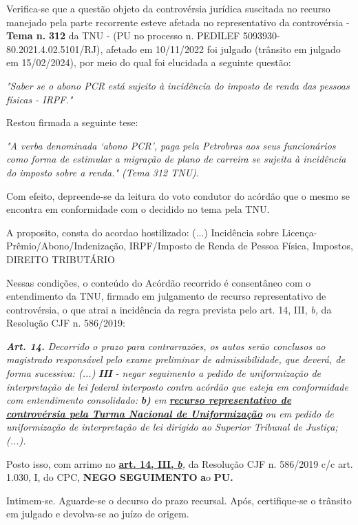 \documentclass[12pt]{article}
\begin{document}
\justifying
\noindent Verifica-se que a questão objeto da controvérsia jurídica suscitada no recurso manejado pela parte recorrente esteve afetada no representativo da controvérsia - \textbf{Tema n. }\textbf{312} da TNU - (PU no processo n. PEDILEF 5093930-80.2021.4.02.5101/RJ),  afetado em 10/11/2022 foi julgado (trânsito em julgado em 15/02/2024), por meio do qual foi elucidada a seguinte questão:

\noindent \textit{"Saber se o abono PCR está sujeito à incidência do imposto de renda das pessoas físicas - IRPF."}

\noindent Restou firmada a seguinte tese:

\noindent \textit{"A verba denominada ‘abono PCR’, paga pela Petrobras aos seus funcionários como forma de estimular a migração de plano de carreira se sujeita à incidência do imposto sobre a renda." (Tema 312 TNU).}

\noindent Com efeito, depreende-se da leitura do voto condutor do acórdão que o mesmo se encontra em conformidade com o decidido no  tema pela TNU.

\noindent A proposito, consta do acordao hostilizado: (...) Incidência sobre Licença-Prêmio/Abono/Indenização, IRPF/Imposto de Renda de Pessoa Física, Impostos, DIREITO TRIBUTÁRIO

\noindent Nessas condições, o conteúdo do Acórdão recorrido é consentâneo com o entendimento da TNU, firmado em julgamento de recurso representativo de controvérsia, o que atrai a incidência da regra prevista pelo art. 14, III, \textit{b,} da Resolução CJF n. 586/2019:

\noindent \textit{\textbf{Art. 14.}}\textit{ Decorrido o prazo para contrarrazões, os autos serão conclusos ao magistrado responsável pelo exame preliminar de admissibilidade, que deverá, de forma sucessiva: (...) }\textit{\textbf{III }}\textit{- negar seguimento a pedido de uniformização de interpretação de lei federal interposto contra acórdão que esteja em conformidade com entendimento consolidado: }\textit{\textbf{b)}}\textit{ em }\uline{\textit{\textbf{recurso representativo de controvérsia pela Turma Nacional de Uniformização}}}\textit{ ou em pedido de uniformização de interpretação de lei dirigido ao Superior Tribunal de Justiça;(...).}

\noindent Posto isso, com arrimo no \uline{\textbf{art. 14, III, }}\uline{\textit{\textbf{b}}}\textit{,} da Resolução CJF n. 586/2019 c/c art. 1.030, I, do CPC, \textbf{NEGO SEGUIMENTO }\textbf{a}o\textbf{ PU}\textbf{.}

\noindent Intimem-se. Aguarde-se o decurso do prazo recursal. Após, certifique-se o trânsito em julgado e devolva-se ao juízo de origem.
\end{document}

